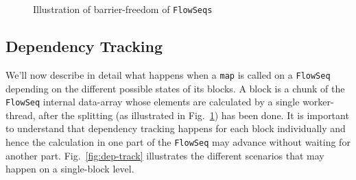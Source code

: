 \documentclass[runningheads,a4paper,fleqn]{llncs}
\begin{document}
\begin{figure}
  \caption{Illustration of barrier-freedom of \texttt{FlowSeqs}}
  \label{fig:barrier-free}
\end{figure}

\subsection{Dependency Tracking}
We'll now describe in detail what happens when a \texttt{map} is
called on a \texttt{FlowSeq} depending on the different possible states of
its blocks. A block is a chunk of the \texttt{FlowSeq} internal
data-array whose elements are calculated by a single worker-thread, after
the splitting (as illustrated 
in Fig.~\ref{fig:barrier-free}) has been done. It is important to
understand that dependency tracking 
happens for each block individually and hence the calculation in one
part of the \texttt{FlowSeq} may advance without waiting for another
part. Fig.~\ref{fig:dep-track} illustrates the different scenarios that
may happen on a single-block level.
\end{document}
